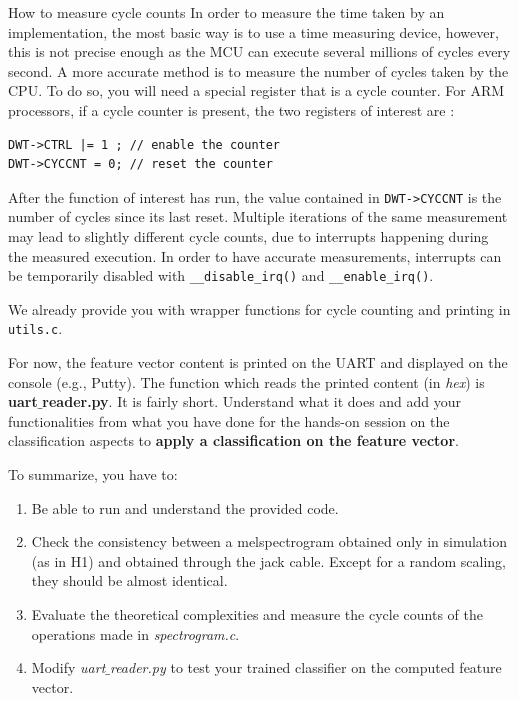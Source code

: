 \begin{bclogo}[couleur = gray!20, arrondi = 0.2, logo=\bcinfo]{How to measure cycle counts} In order to measure the time taken by an implementation, the most basic way is to use a time measuring device, however, this is not precise enough as the MCU can execute several millions of cycles every second. A more accurate method is to measure the number of cycles taken by the CPU. To do so, you will need a special register that is a cycle counter. For ARM processors, if a cycle counter is present, the two registers of interest are :
\begin{lstlisting}[style=customc]
DWT->CTRL |= 1 ; // enable the counter
DWT->CYCCNT = 0; // reset the counter
\end{lstlisting}
After the function of interest has run, the value contained in \texttt{DWT->CYCCNT} is the number of cycles since its last reset. Multiple iterations of the same measurement may lead to slightly different cycle counts, due to interrupts happening during the measured execution. In order to have accurate measurements, interrupts can be temporarily disabled with \texttt{\_\_disable\_irq()} and \texttt{\_\_enable\_irq()}.

We already provide you with wrapper functions for cycle counting and printing in \texttt{utils.c}.
\end{bclogo}

For now, the feature vector content is printed on the UART and displayed on the console (e.g., Putty). The function which reads the printed content (in \emph{hex}) is \textbf{uart$\_$reader.py}. It is fairly short. Understand what it does and add your functionalities from what you have done for the hands-on session on the classification aspects to \textbf{apply a classification on the feature vector}.

%
\noindent To summarize, you have to:
\begin{enumerate}
    \item Be able to run and understand the provided code.
    \item Check the consistency between a melspectrogram obtained only in simulation (as in H1) and obtained through the jack cable. Except for a random scaling, they should be almost identical.
    \item Evaluate the theoretical complexities and measure the cycle counts of the operations made in \emph{spectrogram.c}.
    \item Modify \emph{uart$\_$reader.py} to test your trained classifier on the computed feature vector.
\end{enumerate}
%

